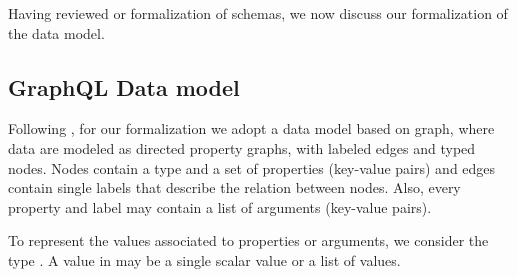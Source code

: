 

Having reviewed or formalization of schemas, we now discuss our formalization of the data model. 

\subsection{GraphQL Data model}\label{subsec:graph}
Following \HP, for our formalization we adopt a data model based on graph, where data are modeled as directed property graphs, with labeled edges and typed nodes. Nodes contain a type and a set of properties (key-value pairs) and  edges contain single labels that describe the relation between nodes. Also, every property and label may contain a list of arguments (key-value pairs).

To represent the values associated to properties or arguments, we consider the type \Vals. A value in \Vals may be a single scalar value or a list of values.

